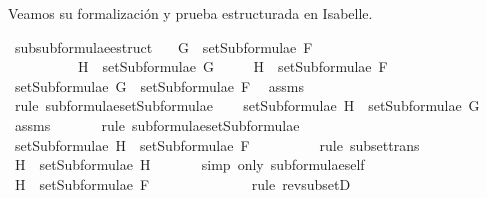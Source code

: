 \begin{isabellebody}
\begin{isamarkuptext}
  Veamos su formalización y prueba estructurada en Isabelle.%
\end{isamarkuptext}\isamarkuptrue%
\isamarkupfalse%
\ subsubformulae{\isacharunderscore}estruct{\isacharcolon}\isanewline
\ \ \ {\isachardoublequoteopen}G\ {\isasymin}\ setSubformulae\ F{\isachardoublequoteclose}\ \isanewline
\ \ \ \ \ \ \ \ \ \ {\isachardoublequoteopen}H\ {\isasymin}\ setSubformulae\ G{\isachardoublequoteclose}\isanewline
\ \ \ \ \ {\isachardoublequoteopen}H\ {\isasymin}\ setSubformulae\ F{\isachardoublequoteclose}\isanewline
%
\isadelimproof
%
\endisadelimproof
%
\isatagproof
{}\isamarkupfalse%
\ {\isacharminus}\isanewline
\ \ \isamarkupfalse%
\ {}{\isacharcolon}{\isachardoublequoteopen}setSubformulae\ G\ {\isasymsubseteq}\ setSubformulae\ F{\isachardoublequoteclose}\ \isamarkupfalse%
\ assms{\isacharparenleft}{}{\isacharparenright}\ \isanewline
\ \ \ \ \isamarkupfalse%
\ {\isacharparenleft}rule\ subformulae{\isacharunderscore}setSubformulae{\isacharparenright}\isanewline
\ \ \isamarkupfalse%
\ {\isachardoublequoteopen}setSubformulae\ H\ {\isasymsubseteq}\ setSubformulae\ G{\isachardoublequoteclose}\ \isamarkupfalse%
\ assms{\isacharparenleft}{}{\isacharparenright}\ \isanewline
\ \ \ \ \isamarkupfalse%
\ {\isacharparenleft}rule\ subformulae{\isacharunderscore}setSubformulae{\isacharparenright}\isanewline
\ \ \isamarkupfalse%
\ \isamarkupfalse%
\ {}{\isacharcolon}{\isachardoublequoteopen}setSubformulae\ H\ {\isasymsubseteq}\ setSubformulae\ F{\isachardoublequoteclose}\ \isamarkupfalse%
\ {}\ \isanewline
\ \ \ \ \isamarkupfalse%
\ {\isacharparenleft}rule\ subset{\isacharunderscore}trans{\isacharparenright}\isanewline
\ \ \isamarkupfalse%
\ {\isachardoublequoteopen}H\ {\isasymin}\ setSubformulae\ H{\isachardoublequoteclose}\ \isanewline
\ \ \ \ \isamarkupfalse%
\ {\isacharparenleft}simp\ only{\isacharcolon}\ subformulae{\isacharunderscore}self{\isacharparenright}\isanewline
\ \ \isamarkupfalse%
\ \isamarkupfalse%
\ {\isachardoublequoteopen}H\ {\isasymin}\ setSubformulae\ F{\isachardoublequoteclose}\ \isanewline
\ \ \ \ \isamarkupfalse%
\ {}\ \isanewline
\ \ \ \ \isamarkupfalse%
\ {\isacharparenleft}rule\ rev{\isacharunderscore}subsetD{\isacharparenright}\isanewline

\end{isabellebody}
